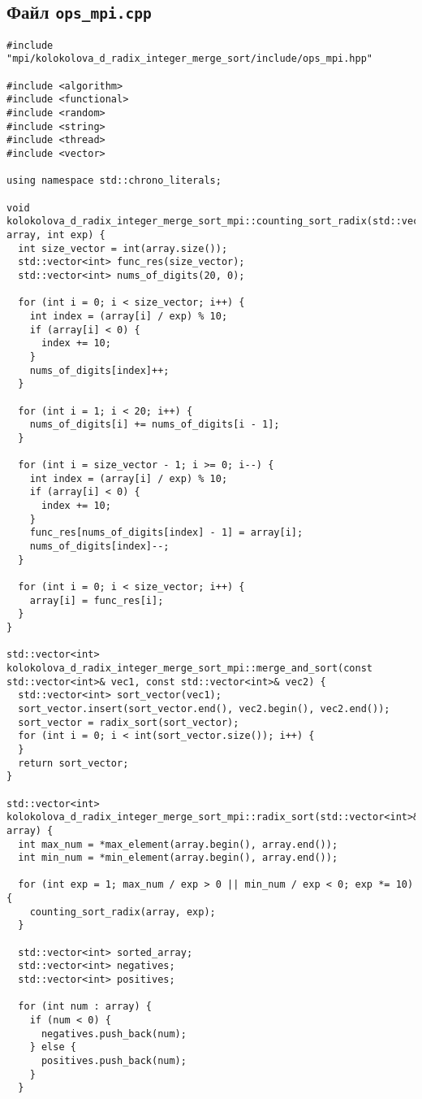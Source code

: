 \documentclass[12pt]{article}
\begin{document}
\subsection*{Файл \texttt{ops\_mpi.cpp}}

\begin{lstlisting}
#include "mpi/kolokolova_d_radix_integer_merge_sort/include/ops_mpi.hpp"

#include <algorithm>
#include <functional>
#include <random>
#include <string>
#include <thread>
#include <vector>

using namespace std::chrono_literals;

void kolokolova_d_radix_integer_merge_sort_mpi::counting_sort_radix(std::vector<int>& array, int exp) {
  int size_vector = int(array.size());
  std::vector<int> func_res(size_vector);
  std::vector<int> nums_of_digits(20, 0);

  for (int i = 0; i < size_vector; i++) {
    int index = (array[i] / exp) % 10;
    if (array[i] < 0) {
      index += 10;
    }
    nums_of_digits[index]++;
  }

  for (int i = 1; i < 20; i++) {
    nums_of_digits[i] += nums_of_digits[i - 1];
  }

  for (int i = size_vector - 1; i >= 0; i--) {
    int index = (array[i] / exp) % 10;
    if (array[i] < 0) {
      index += 10;
    }
    func_res[nums_of_digits[index] - 1] = array[i];
    nums_of_digits[index]--;
  }

  for (int i = 0; i < size_vector; i++) {
    array[i] = func_res[i];
  }
}

std::vector<int> kolokolova_d_radix_integer_merge_sort_mpi::merge_and_sort(const std::vector<int>& vec1, const std::vector<int>& vec2) {
  std::vector<int> sort_vector(vec1);
  sort_vector.insert(sort_vector.end(), vec2.begin(), vec2.end());
  sort_vector = radix_sort(sort_vector);
  for (int i = 0; i < int(sort_vector.size()); i++) {
  }
  return sort_vector;
}

std::vector<int> kolokolova_d_radix_integer_merge_sort_mpi::radix_sort(std::vector<int>& array) {
  int max_num = *max_element(array.begin(), array.end());
  int min_num = *min_element(array.begin(), array.end());

  for (int exp = 1; max_num / exp > 0 || min_num / exp < 0; exp *= 10) {
    counting_sort_radix(array, exp);
  }

  std::vector<int> sorted_array;
  std::vector<int> negatives;
  std::vector<int> positives;

  for (int num : array) {
    if (num < 0) {
      negatives.push_back(num);
    } else {
      positives.push_back(num);
    }
  }


\end{lstlisting}
\end{document}
